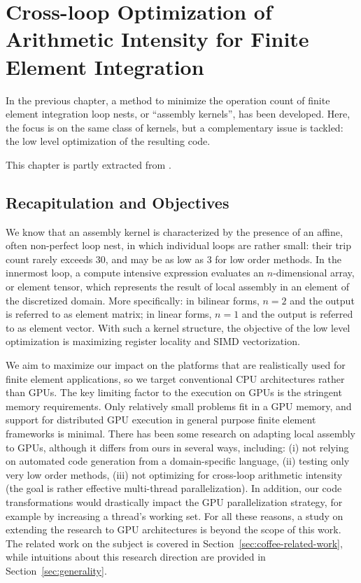 \chapter{Cross-loop Optimization of Arithmetic Intensity for Finite Element Integration}
\label{ch:lowlevelopt}

In the previous chapter, a method to minimize the operation count of finite element integration loop nests, or ``assembly kernels'', has been developed. Here, the focus is on the same class of kernels, but a complementary issue is tackled: the low level optimization of the resulting code. 

This chapter is partly extracted from \cite{Luporini-coffee}.

\section{Recapitulation and Objectives}

We know that an assembly kernel is characterized by the presence of an affine, often non-perfect loop nest, in which individual loops are rather small: their trip count rarely exceeds 30, and may be as low as 3 for low order methods. In the innermost loop, a compute intensive expression evaluates an $n$-dimensional array, or element tensor, which represents the result of local assembly in an element of the discretized domain. More specifically: in bilinear forms, $n=2$ and the output is referred to as element matrix; in linear forms, $n=1$ and the output is referred to as element vector. With such a kernel structure, the objective of the low level optimization is maximizing register locality and SIMD vectorization.

We aim to maximize our impact on the platforms that are realistically used for finite element applications, so we target conventional CPU architectures rather than GPUs. The key limiting factor to the execution on GPUs is the stringent memory requirements. Only relatively small problems fit in a GPU memory, and support for distributed GPU execution in general purpose finite element frameworks is minimal. There has been some research on adapting local assembly to GPUs, although it differs from ours in several ways, including: (i) not relying on automated code generation from a domain-specific language, (ii) testing only very low order methods, (iii) not optimizing for cross-loop arithmetic intensity (the goal is rather effective multi-thread parallelization). In addition, our code transformations would drastically impact the GPU parallelization strategy, for example by increasing a thread's working set. For all these reasons, a study on extending the research to GPU architectures is beyond the scope of this work. The related work on the subject is covered in Section~\ref{sec:coffee-related-work}, while intuitions about this research direction are provided in Section~\ref{sec:generality}.

